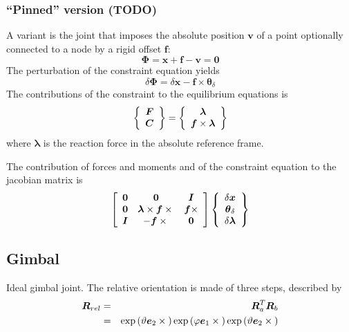 \documentclass[10pt,dvips]{report}
\newcommand{\T}[1]{\boldsymbol{#1}}
\begin{document}
\subsubsection{``Pinned'' version (TODO)}
A variant is the joint that imposes the absolute position $\T{v}$ of a point
optionally connected to a node by a rigid offset $\T{f}$:
\begin{equation}
		\T{\Phi} = \T{x} + \T{f} - \T{v} = \T{0}
\end{equation}
The perturbation of the constraint equation yields
\begin{equation}
	\delta\T{\Phi} = 
	\delta\T{x} - \T{f}\times \T{\theta}_{\delta}
\end{equation}
The contributions of the constraint to the equilibrium equations is
\begin{equation}
	\cubr{\cvvect{
		\T{F} \\
		\T{C}
	}} = \cubr{\cvvect{
		\T{\lambda} \\
		\T{f}\times \T{\lambda}
	}}
\end{equation}
where $\T{\lambda}$ is the reaction force in the absolute reference frame.

The contribution of forces and moments and of the constraint equation 
to the jacobian matrix is
\begin{equation*}
	\sqbr{\matr{ccc}{
		\T{0} &
			\T{0} &
			\T{I} \\
		\T{0} &
			\T{\lambda}\times\T{f}\times{} &
			\T{f}\times \\
		\T{I} &
			- \T{f}\times{} &
			\T{0}
	}}\cubr{\cvvect{
		\delta\T{x} \\
		\T{\theta}_{\delta} \\
		\delta\T{\lambda}
	}}
\end{equation*}










\subsection{Gimbal}
Ideal gimbal joint.
The relative orientation is made of three steps, described by
\begin{eqnarray*}
	\T{R}_{rel}
	& = & \T{R}_a^T \T{R}_b \\
	& = & \llk{exp}\plbr{\vartheta \T{e}_2 \times{}}
		\llk{exp}\plbr{\varphi \T{e}_1 \times{}}
		\llk{exp}\plbr{\vartheta \T{e}_2 \times{}}
\end{eqnarray*}
\end{document}

